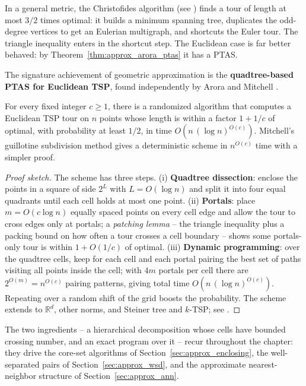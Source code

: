 \begin{example}\label{ex:approx_tsp_ratio}
  In a general metric, the Christofides algorithm (see \cite{cormen2009})
  finds a tour of length at most $3/2$ times optimal: it builds a minimum
  spanning tree, duplicates the odd-degree vertices to get an Eulerian
  multigraph, and shortcuts the Euler tour. The triangle inequality enters
  in the shortcut step. The Euclidean case is far better behaved: by
  Theorem~\ref{thm:approx_arora_ptas} it has a PTAS.
\end{example}

The signature achievement of geometric approximation is the
\textbf{quadtree-based PTAS for Euclidean TSP}, found independently by
Arora \cite{arora1998} and Mitchell \cite{mitchell1999}.

\begin{theorem}\label{thm:approx_arora_ptas}
  For every fixed integer $c \geq 1$, there is a randomized algorithm that
  computes a Euclidean TSP tour on $n$ points whose length is within a
  factor $1 + 1/c$ of optimal, with probability at least $1/2$, in time
  $O(n\,(\log n)^{O(c)})$. Mitchell's guillotine subdivision method gives a
  deterministic scheme in $n^{O(c)}$ time with a simpler proof.
\end{theorem}

\begin{proof}[Proof sketch]
  The scheme has three steps. (i) \textbf{Quadtree dissection}: enclose the
  points in a square of side $2^L$ with $L = O(\log n)$ and split it into
  four equal quadrants until each cell holds at most one point.
  (ii) \textbf{Portals}: place $m = O(c \log n)$ equally spaced points on
  every cell edge and allow the tour to cross edges only at portals; a
  \emph{patching lemma} -- the triangle inequality plus a packing bound on
  how often a tour crosses a cell boundary -- shows some portals-only tour
  is within $1 + O(1/c)$ of optimal. (iii) \textbf{Dynamic programming}:
  over the quadtree cells, keep for each cell and each portal pairing the
  best set of paths visiting all points inside the cell; with $4m$ portals
  per cell there are $2^{O(m)} = n^{O(c)}$ pairing patterns, giving total
  time $O(n\,(\log n)^{O(c)})$. Repeating over a random shift of the grid
  boosts the probability. The scheme extends to $\mathbb{R}^d$, other norms,
  and Steiner tree and $k$-TSP; see \cite{arora1998,mitchell1999}.
\end{proof}

\begin{remark}
  The two ingredients -- a hierarchical decomposition whose cells have
  bounded crossing number, and an exact program over it -- recur throughout
  the chapter: they drive the core-set algorithms of
  Section~\ref{sec:approx_enclosing}, the well-separated pairs of
  Section~\ref{sec:approx_wsd}, and the approximate nearest-neighbor
  structure of Section~\ref{sec:approx_ann}.
\end{remark}

